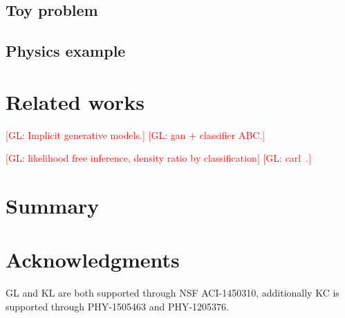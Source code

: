 \documentclass[twocolumn,superscriptaddress,aps]{revtex4-1}
\newcommand{\glnote}[1]{\textcolor{red}{[GL: #1]}}
\theoremstyle{plain}
\begin{document}
\subsection{Toy problem}

\subsection{Physics example}



\section{Related works}


\glnote{Implicit generative models.}
\glnote{gan + classifier ABC.}

\glnote{likelihood free inference, density ratio by classification}
\glnote{carl~\citep{cranmer2015approximating}.}





\section{Summary}




\section*{Acknowledgments}

GL and KL are both supported through NSF ACI-1450310, additionally KC is
supported through PHY-1505463 and PHY-1205376.





\end{document}
